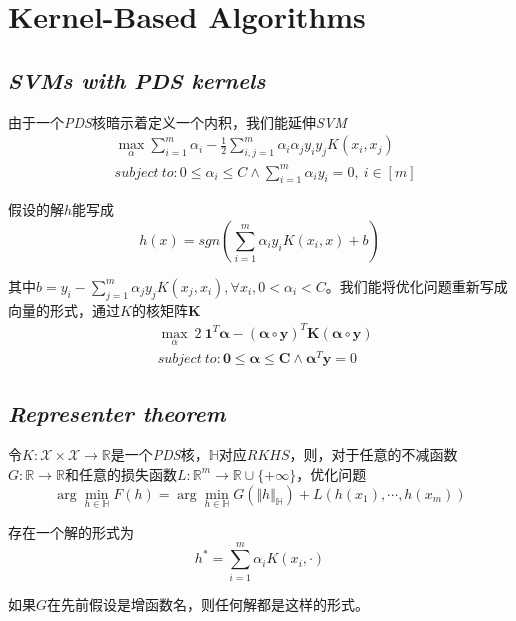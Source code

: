 \section{Kernel-Based Algorithms}

\subsection*{\textsl{SVMs with PDS kernels}}

由于一个\textsl{PDS}核暗示着定义一个内积，我们能延伸\textsl{SVM}
\begin{equation}
    \begin{aligned}
        & \max_{\alpha}\sum_{i=1}^{m}\alpha_i-\frac{1}{2}\sum_{i,j=1}^{m}\alpha_i\alpha_j y_i y_j K(x_i,x_j) \\
        & subject\ to:0\leqslant \alpha_i\leqslant C \wedge \sum_{i=1}^{m}\alpha_iy_i=0,\ i\in [m]
    \end{aligned}
\end{equation}

假设的解$h$能写成
\begin{equation}
    h(x)=sgn\left(\sum_{i=1}^{m}\alpha_iy_iK(x_i,x)+b\right)
\end{equation}

其中$b=y_i-\sum_{j=1}^{m}\alpha_jy_jK(x_j,x_i),\forall x_i,0<\alpha_i<C$。我们能将优化问题重新写成向量的形式，通过$K$的核矩阵$\mathbf{K}$
\begin{equation}
    \begin{aligned}
        & \max_{\alpha}\ 2\ \mathbf{1}^T\mathbf{\alpha}-(\mathbf{\alpha}\circ \mathbf{y})^T\mathbf{K}(\mathbf{\alpha}\circ \mathbf{y})\\
        & subject\ to:\mathbf{0}\leqslant \mathbf{\alpha}\leqslant \mathbf{C}\wedge \mathbf{\alpha}^T\mathbf{y}=0
    \end{aligned}
\end{equation}

\subsection*{\textsl{Representer theorem}}

\begin{mdframed}
    \begin{theorem}
        令$K:\mathcal{X}\times\mathcal{X}\rightarrow\mathbb{R}$是一个\textsl{PDS}核，$\mathbb{H}$对应$RKHS$，则，对于任意的不减函数$G:\mathbb{R}\rightarrow \mathbb{R}$和任意的损失函数$L:\mathbb{R}^m\rightarrow \mathbb{R}\cup \{+\infty\}$，优化问题
        \begin{equation}
            \arg\min_{h\in \mathbb{H}} F(h)=\arg\min_{h\in \mathbb{H}} G(\Vert h\Vert_\mathbb{H})+L(h(x_1),\cdots,h(x_m))
        \end{equation}

        存在一个解的形式为
        \begin{equation}
            h^*=\sum_{i=1}^{m}\alpha_i K(x_i,\cdot)
        \end{equation}

        如果$G$在先前假设是增函数名，则任何解都是这样的形式。
    \end{theorem}
\end{mdframed}

